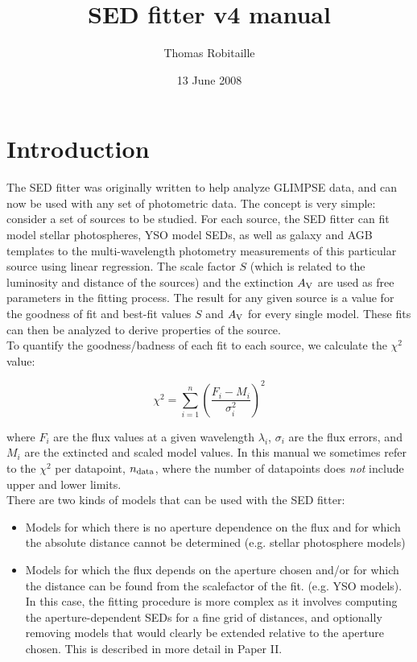 \documentclass[letterpaper,11pt]{report}
\begin{document}
\title{\bf SED fitter v4 manual}
\author{Thomas Robitaille}
\date{13 June 2008}
\maketitle

{\scriptsize
\tableofcontents
}

\newpage

\chapter*{Introduction} 

The SED fitter was originally written to help analyze GLIMPSE data, and can now be used with any set of photometric data. The concept is very simple: consider a set of sources to be studied. For each source, the SED fitter can fit model stellar photospheres, YSO model SEDs, as well as galaxy and AGB templates to the multi-wavelength photometry measurements of this particular source using linear regression. The scale factor $S$ (which is related to the luminosity and distance of the sources) and the extinction $A_{\rm V}$ are used as free parameters in the fitting process. The result for any given source is a value for the goodness of fit and best-fit values $S$ and $A_{\rm V}$ for every single model. These fits can then be analyzed to derive properties of the source.\\

To quantify the goodness/badness of each fit to each source, we calculate the $\chi^2$ value:

\begin{displaymath}
\chi^2=\sum_{i=1}^{n}\left(\frac{F_{i}-M_{i}}{\sigma_{i}^2}\right)^2
\end{displaymath}

where $F_{i}$ are the flux values at a given wavelength $\lambda_{i}$, $\sigma_{i}$ are the flux errors, and $M_{i}$ are the extincted and scaled model values. In this manual we sometimes refer to the $\chi^2$ per datapoint, $n_{\rm data}$, where the number of datapoints does \textit{not} include upper and lower limits.\\

There are two kinds of models that can be used with the SED fitter:

\begin{itemize}
\item Models for which there is no aperture dependence on the flux and for which the absolute distance cannot be determined (e.g. stellar photosphere models)
\item Models for which the flux depends on the aperture chosen and/or for which the distance can be found from the scalefactor of the fit. (e.g. YSO models). In this case, the fitting procedure is more complex as it involves computing the aperture-dependent SEDs for a fine grid of distances, and optionally removing models that would clearly be extended relative to the aperture chosen. This is described in more detail in Paper II.
\end{itemize}
\end{document}

